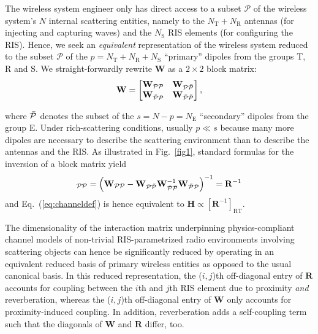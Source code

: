 \documentclass[journal,12pt,onecolumn,draftclsnofoot]{IEEEtran}
\begin{document}
The wireless system engineer only has direct access to a subset $\mathcal{P}$ of the wireless system's $N$ internal scattering entities, namely to the $N_{\mathrm{T}}+N_{\mathrm{R}}$ antennas (for injecting and capturing waves) and the $N_{\mathrm{S}}$ RIS elements (for configuring the RIS). 
Hence, we seek an \textit{equivalent} representation of the wireless system reduced to the subset $\mathcal{P}$ of the $p=N_{\mathrm{T}}+N_{\mathrm{R}}+N_{\mathrm{S}}$ ``primary'' dipoles from the groups T, R and S.
We straight-forwardly rewrite $\mathbf{W}$ as a $2 \times 2$ block matrix:
\begin{equation}
    \mathbf{W} = \begin{bmatrix} 
	\mathbf{W}_{\mathcal{PP}}  & \mathbf{W}_{\mathcal{P\Bar{P}}} \\
	\mathbf{W}_{\mathcal{\Bar{P}P}}  & \mathbf{W}_{\mathcal{\Bar{P}\Bar{P}}} \\
\end{bmatrix},
\label{eq:reducedbasis}
\end{equation}

\noindent where $\mathcal{\Bar{P}}$ denotes the subset of the $s=N-p=N_{\mathrm{E}}$ ``secondary'' dipoles from the group E. Under rich-scattering conditions, usually $p \ll s $ because many more dipoles are necessary to describe the scattering environment than to describe the antennas and the RIS.
As illustrated in Fig.~\ref{fig1}, standard formulas for the inversion of a block matrix yield
\begin{equation}
    [\mathbf{W}^{-1}]_{\mathcal{PP}} = \left( \mathbf{W}_{\mathcal{PP}} - \mathbf{W}_{\mathcal{P\Bar{P}}} \mathbf{W}_{\mathcal{\Bar{P}\Bar{P}}}^{-1} \mathbf{W}_{\mathcal{\Bar{P}P}} \right)^{-1} = \mathbf{R}^{-1}
\label{eq:blockwiseinversion}
\end{equation}
and Eq.~(\ref{eq:channeldef}) is hence equivalent to $\mathbf{H} \propto [\mathbf{R}^{-1}]_\mathrm{RT}$.

The dimensionality of the interaction matrix underpinning physics-compliant channel models of non-trivial RIS-parametrized radio environments involving scattering objects can hence be significantly reduced by operating in an equivalent reduced basis of primary wireless entities as opposed to the usual canonical basis. In this reduced representation, the ($i,j$)th off-diagonal entry of $\mathbf{R}$ accounts for coupling between the $i$th and $j$th RIS element due to proximity \textit{and} reverberation, whereas the ($i,j$)th off-diagonal entry of $\mathbf{W}$ only accounts for proximity-induced coupling. In addition, reverberation adds a self-coupling term such that the diagonals of $\mathbf{W}$ and $\mathbf{R}$ differ, too.
 
\end{document}
